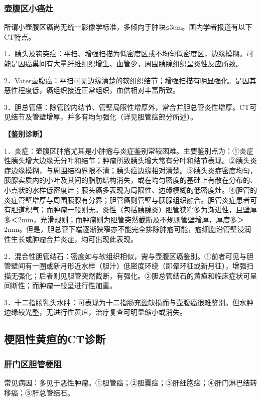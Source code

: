 \subsubsection{壶腹区小癌灶}

所谓小壶腹区癌尚无统一影像学标准，多倾向于肿块≤3cm。国内学者报道有以下CT特点。

1．胰头及钩突癌：平扫、增强扫描为低密度区或不均匀低密度区，边缘模糊。可能是因癌巢间有大量纤维组织增生、血管少，周围胰腺组织呈炎性反应所致。

2．Vater壶腹癌：平扫可见边缘清楚的软组织结节；增强扫描有明显强化。是因其恶性程度低，癌组织接近正常组织，血供相对丰富所致。

3．胆总管癌：除管腔内结节、管壁局限性增厚外，常合并胆总管炎性增厚。CT可见结节及管壁增厚，并多有均匀强化（详见胆管癌部分所述）。

\textbf{【鉴别诊断】}

1．炎症：壶腹区肿瘤尤其是小肿瘤与炎症鉴别常较困难。主要鉴别点为：①炎症性胰头增大边缘无分叶和结节；肿瘤所致胰头增大常有分叶和结节表现。②胰头炎症边缘模糊，与周围结构界限不清；胰头癌边缘相对清楚。③胰头炎症密度均匀，胰腺实质内的小叶及其间的脂肪结构消失，或在均匀密度的基础上有散在分布的、小点状的水样低密度灶；胰头癌多表现为局限性、边缘模糊的低密度灶。④胆管的炎症管壁增厚与周围胰腺有分界；胆管癌则管壁与胰腺组织融合。胆管炎症患者可有胆道积气；而肿瘤一般则无。炎性（包括胰腺炎）胆管狭窄多为渐进性，且壁厚多＜2mm，光滑规则；而肿瘤则为胆管突然截断及不规则管壁增厚，厚度多＞2mm。但是，胆总管下端逐渐狭窄亦不能完全排除肿瘤可能，瘤细胞沿管壁浸润性生长或肿瘤合并炎症，均可出现此表现。

2．混合性胆管结石：密度如与软组织相似，需与壶腹区癌鉴别。①前者可见与胆管壁间有一圈或新月形近水样（胆汁）低密度环绕（即晕环征或新月征），增强扫描无强化；后者则见胆管突然截断，有强化。②胆总管结石的黄疸和临床症状可呈间断性；而肿瘤一般呈进行性加重。

3．十二指肠乳头水肿：可表现为十二指肠充盈缺损而与壶腹癌很难鉴别。但水肿边缘较光整，无进行性黄疸，治疗复查可明显缩小或消失。

\subsection{梗阻性黄疸的CT诊断}

\subsubsection{肝门区胆管梗阻}

常见病因：多见于恶性肿瘤。①胆管癌；②胆囊癌；③肝细胞癌；④肝门淋巴结转移癌；⑤肝总管结石。

